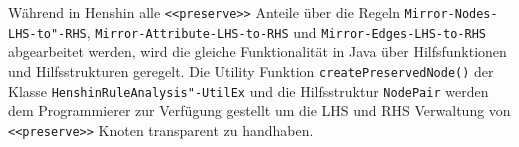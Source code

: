 Während in Henshin alle  \texttt{<<preserve>>} Anteile über die Regeln
\texttt{Mirror-Nodes-LHS-to"-RHS}, \texttt{Mirror-Attribute-LHS-to-RHS} und
\texttt{Mirror-Edges-LHS-to-RHS} abgearbeitet werden, wird die gleiche Funktionalität in Java über
Hilfsfunktionen und Hilfsstrukturen geregelt. Die Utility Funktion \texttt{createPreservedNode()}
der Klasse \texttt{HenshinRuleAnalysis"-UtilEx} und die Hilfsstruktur \texttt{NodePair} werden dem
Programmierer zur Verfügung gestellt um die LHS und RHS Verwaltung von \texttt{<<preserve>>} Knoten
transparent zu handhaben.
 
% 

